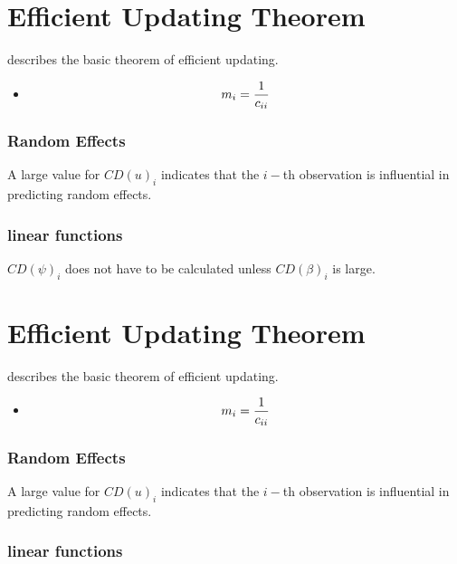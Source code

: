 \documentclass[12pt, a4paper]{article}
\begin{document}
\section{Efficient Updating Theorem} %
\citet{Zewotir} describes the basic theorem of efficient updating.
\begin{itemize}
	\item \[ m_i = {1 \over c_{ii}}\]
\end{itemize}


\subsubsection{Random Effects}

A large value for $CD(u)_i$ indicates that the $i-$th observation is influential in predicting random effects.

\subsubsection{linear functions}

$CD(\psi)_i$ does not have to be calculated unless $CD(\beta)_i$ is large.




\section{Efficient Updating Theorem} %
\citet{Zewotir} describes the basic theorem of efficient updating.
\begin{itemize}
	\item \[ m_i = {1 \over c_{ii}}\]
\end{itemize}





\subsubsection{Random Effects}


A large value for $CD(u)_i$ indicates that the $i-$th observation is influential in predicting random effects.


\subsubsection{linear functions}
\end{document}
